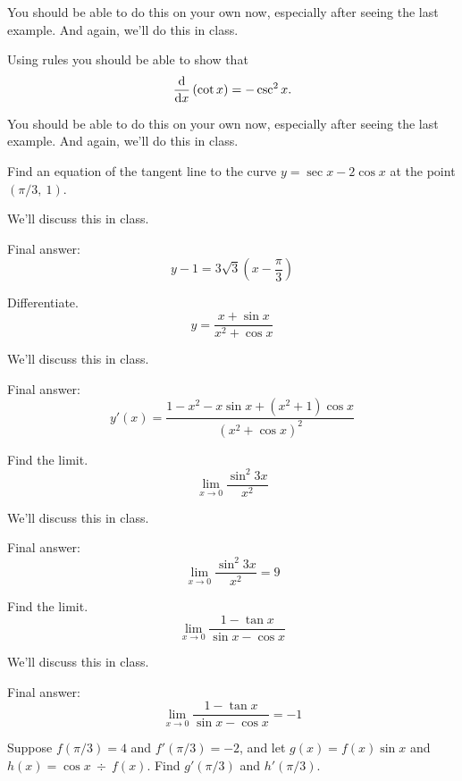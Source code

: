 \documentclass[12pt,addpoints, answers, fleqn]{exam}
\begin{document}
\begin{questions}
\begin{solution}
You should be able to do this on your own now, especially after seeing the last example. And again, we'll do this in class.
\end{solution}

\question Using rules you should be able to show that
\[
\frac{{\rm{d}}}{{\rm{d}}x} \left( \cot x \right) = -\csc^2 x.
\]

\begin{solution}
You should be able to do this on your own now, especially after seeing the last example. And again, we'll do this in class.
\end{solution}

\question Find an equation of the tangent line to the curve $y = \sec x - 2 \cos x$ at the point $\left( \pi/3, \ 1\right)$.

\begin{solution}
We'll discuss this in class.

Final answer:
\[
y-1=3\sqrt{3} \left(x-\frac{\pi}{3} \right)
\]
\end{solution}

\question Differentiate.
\[
y = \frac{x + \sin x}{x^2+ \cos x}
\]

\begin{solution}
We'll discuss this in class.

Final answer:
\[
y' \left( x \right) = \frac{1 - x^2 - x \sin x + \left( x^2 + 1 \right) \cos x}{\left( x^2+ \cos x \right)^2}
\]
\end{solution}

\question Find the limit.
\[
\mathop {\lim }\limits_{x \to 0} \frac{\sin^2 3x }{ x^2}
\]

\begin{solution}
We'll discuss this in class.

Final answer:
\[
\mathop {\lim }\limits_{x \to 0} \frac{\sin^2 3x }{ x^2} = 9
\]
\end{solution}

\question Find the limit.
\[
\mathop {\lim }\limits_{x \to 0} \frac{1 - \tan x}{ \sin x - \cos x}
\]


\begin{solution}
We'll discuss this in class.

Final answer:
\[
\mathop {\lim }\limits_{x \to 0} \frac{1 - \tan x}{ \sin x - \cos x} =-1
\]
\end{solution}


\question Suppose $f\left( \pi / 3 \right) = 4$ and $f'\left( \pi / 3 \right) = -2$, and let $g\left( x \right) = f\left( x \right) \sin x$ and $h\left( x \right) = \cos x \ \div \ f\left( x \right)$. Find $g'\left( \pi / 3 \right)$ and $h'\left( \pi / 3 \right)$.


\end{questions}
\end{document}
